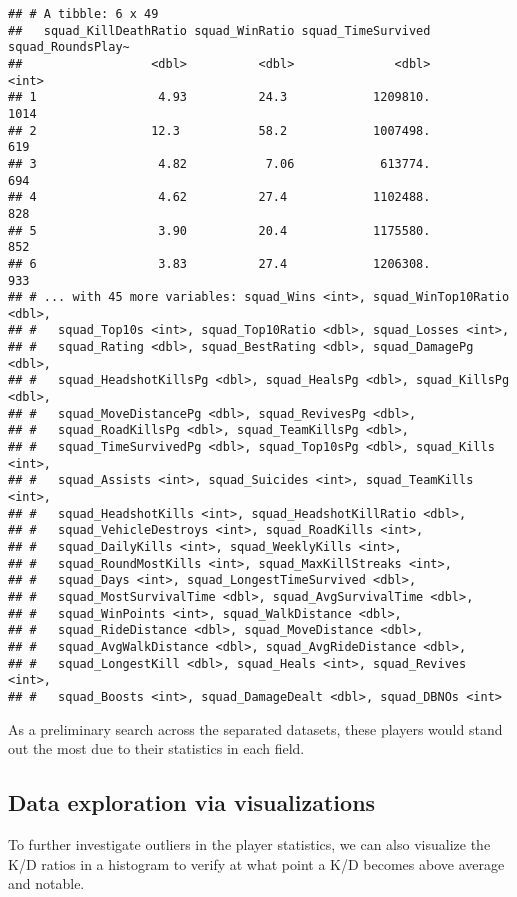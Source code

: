 \documentclass[]{article}
\begin{document}
\begin{verbatim}
## # A tibble: 6 x 49
##   squad_KillDeathRatio squad_WinRatio squad_TimeSurvived squad_RoundsPlay~
##                  <dbl>          <dbl>              <dbl>             <int>
## 1                 4.93          24.3            1209810.              1014
## 2                12.3           58.2            1007498.               619
## 3                 4.82           7.06            613774.               694
## 4                 4.62          27.4            1102488.               828
## 5                 3.90          20.4            1175580.               852
## 6                 3.83          27.4            1206308.               933
## # ... with 45 more variables: squad_Wins <int>, squad_WinTop10Ratio <dbl>,
## #   squad_Top10s <int>, squad_Top10Ratio <dbl>, squad_Losses <int>,
## #   squad_Rating <dbl>, squad_BestRating <dbl>, squad_DamagePg <dbl>,
## #   squad_HeadshotKillsPg <dbl>, squad_HealsPg <dbl>, squad_KillsPg <dbl>,
## #   squad_MoveDistancePg <dbl>, squad_RevivesPg <dbl>,
## #   squad_RoadKillsPg <dbl>, squad_TeamKillsPg <dbl>,
## #   squad_TimeSurvivedPg <dbl>, squad_Top10sPg <dbl>, squad_Kills <int>,
## #   squad_Assists <int>, squad_Suicides <int>, squad_TeamKills <int>,
## #   squad_HeadshotKills <int>, squad_HeadshotKillRatio <dbl>,
## #   squad_VehicleDestroys <int>, squad_RoadKills <int>,
## #   squad_DailyKills <int>, squad_WeeklyKills <int>,
## #   squad_RoundMostKills <int>, squad_MaxKillStreaks <int>,
## #   squad_Days <int>, squad_LongestTimeSurvived <dbl>,
## #   squad_MostSurvivalTime <dbl>, squad_AvgSurvivalTime <dbl>,
## #   squad_WinPoints <int>, squad_WalkDistance <dbl>,
## #   squad_RideDistance <dbl>, squad_MoveDistance <dbl>,
## #   squad_AvgWalkDistance <dbl>, squad_AvgRideDistance <dbl>,
## #   squad_LongestKill <dbl>, squad_Heals <int>, squad_Revives <int>,
## #   squad_Boosts <int>, squad_DamageDealt <dbl>, squad_DBNOs <int>
\end{verbatim}

As a preliminary search across the separated datasets, these players
would stand out the most due to their statistics in each field.

\subsection{Data exploration via
visualizations}\label{data-exploration-via-visualizations}

To further investigate outliers in the player statistics, we can also
visualize the K/D ratios in a histogram to verify at what point a K/D
becomes above average and notable.
\end{document}
